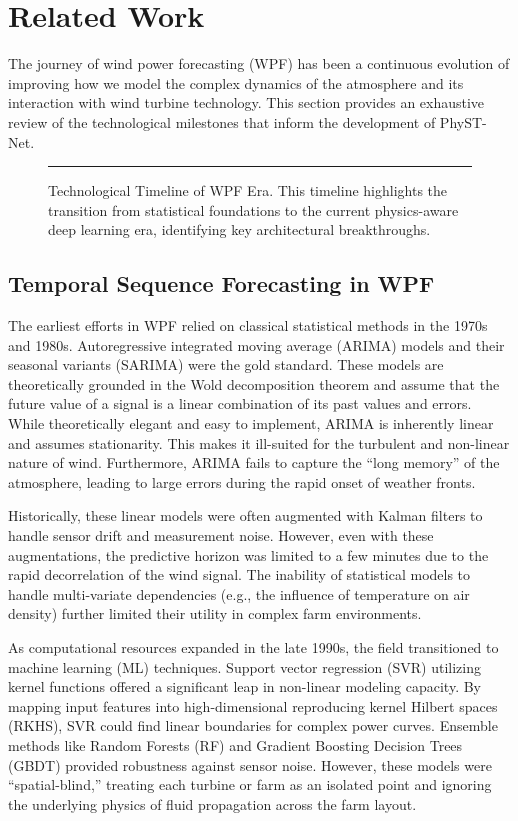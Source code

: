 \section{Related Work}
\label{sec:related_work}
The journey of wind power forecasting (WPF) has been a continuous evolution of improving how we model the complex dynamics of the atmosphere and its interaction with wind turbine technology. This section provides an exhaustive review of the technological milestones that inform the development of PhyST-Net.

\begin{figure}[!t]
\centering
\rule{0.48\textwidth}{0.35\textwidth}
\caption{Technological Timeline of WPF Era. This timeline highlights the transition from statistical foundations to the current physics-aware deep learning era, identifying key architectural breakthroughs.}
\label{fig:timeline}
\end{figure}

\subsection{Temporal Sequence Forecasting in WPF}
\label{sec:related_temporal}
The earliest efforts in WPF relied on classical statistical methods in the 1970s and 1980s. Autoregressive integrated moving average (ARIMA) models and their seasonal variants (SARIMA) were the gold standard. These models are theoretically grounded in the Wold decomposition theorem and assume that the future value of a signal is a linear combination of its past values and errors. While theoretically elegant and easy to implement, ARIMA is inherently linear and assumes stationarity. This makes it ill-suited for the turbulent and non-linear nature of wind. Furthermore, ARIMA fails to capture the ``long memory'' of the atmosphere, leading to large errors during the rapid onset of weather fronts. 

Historically, these linear models were often augmented with Kalman filters to handle sensor drift and measurement noise. However, even with these augmentations, the predictive horizon was limited to a few minutes due to the rapid decorrelation of the wind signal. The inability of statistical models to handle multi-variate dependencies (e.g., the influence of temperature on air density) further limited their utility in complex farm environments.

As computational resources expanded in the late 1990s, the field transitioned to machine learning (ML) techniques. Support vector regression (SVR) utilizing kernel functions offered a significant leap in non-linear modeling capacity. By mapping input features into high-dimensional reproducing kernel Hilbert spaces (RKHS), SVR could find linear boundaries for complex power curves. Ensemble methods like Random Forests (RF) and Gradient Boosting Decision Trees (GBDT) provided robustness against sensor noise. However, these models were ``spatial-blind,'' treating each turbine or farm as an isolated point and ignoring the underlying physics of fluid propagation across the farm layout.

